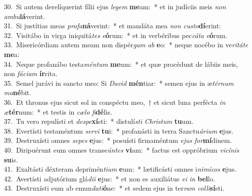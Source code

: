 {30.~}Si autem derelíquerint fílii ejus \textit{le}\textit{gem} \textbf{me}am:~* et in judíciis meis \textit{non} \textit{am}\textit{bu}\textbf{lá}verint.\\
{31.~}Si justítias meas \textit{pro}\textit{fa}\textbf{ná}verint:~* et mandáta mea \textit{non} \textit{cu}\textit{sto}\textbf{dí}erint:\\
{32.~}Visitábo in virga iniquitá\textit{tes} \textit{e}\textbf{ó}rum:~* et in verbéribus pec\textit{cá}\textit{ta} \textit{e}\textbf{ó}rum.\\
{33.~}Misericórdiam autem meam non dispér\textit{gam} \textit{ab} \textbf{e}o:~* neque nocébo in ve\textit{ri}\textit{tá}\textit{te} \textbf{me}a:\\
{34.~}Neque profanábo testa\textit{mén}\textit{tum} \textbf{me}um:~* et quæ procédunt de lábiis meis, non \textit{fá}\textit{ci}\textit{am} \textbf{ír}rita.\\
{35.~}Semel jurávi in sancto meo: Si \textit{Da}\textit{vid} \textbf{mén}tiar:~* semen ejus in æ\textit{tér}\textit{num} \textit{ma}\textbf{né}bit.\\
{36.~}Et thronus ejus sicut sol in conspéctu meo,~† et sicut luna perfécta \textit{in} \textit{æ}\textbf{tér}num:~* et testis in \textit{cæ}\textit{lo} \textit{fi}\textbf{dé}lis.\\
{37.~}Tu vero repulísti et \textit{de}\textit{spe}\textbf{xí}sti:~* distulí\textit{sti} \textit{Chri}\textit{stum} \textbf{tu}um.\\
{38.~}Evertísti testaméntum \textit{ser}\textit{vi} \textbf{tu}i:~* profanásti in terra Sanctu\textit{á}\textit{ri}\textit{um} \textbf{e}jus.\\
{39.~}Destruxísti omnes \textit{se}\textit{pes} \textbf{e}jus:~* posuísti firmaméntum \textit{e}\textit{jus} \textit{for}\textbf{mí}dinem.\\
{40.~}Diripuérunt eum omnes transe\textit{ún}\textit{tes} \textbf{vi}am:~* factus est oppróbrium \textit{vi}\textit{cí}\textit{nis} \textbf{su}is.\\
{41.~}Exaltásti déxteram deprimén\textit{ti}\textit{um} \textbf{e}um:~* lætificásti omnes i\textit{ni}\textit{mí}\textit{cos} \textbf{e}jus.\\
{42.~}Avertísti adjutórium glá\textit{di}\textit{i} \textbf{e}jus:~* et non es auxiliátus \textit{e}\textit{i} \textit{in} \textbf{bel}lo.\\
{43.~}Destruxísti eum ab emun\textit{da}\textit{ti}\textbf{ó}ne:~* et sedem ejus in ter\textit{ram} \textit{col}\textit{li}\textbf{sí}sti.\\
